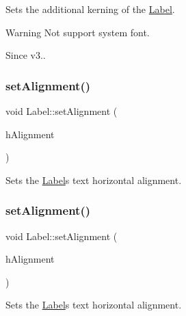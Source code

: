 Sets the additional kerning of the \hyperlink{classLabel}{Label}.

\begin{DoxyWarning}{Warning}
Not support system font. 
\end{DoxyWarning}
\begin{DoxySince}{Since}
v3.. 
\end{DoxySince}
\mbox{\label{classLabel_a2dd709f7a812d19d666b3b063534d34b}} 
\subsubsection{\texorpdfstring{set\+Alignment()}{setAlignment()}\hspace{0.1cm}{\footnotesize\ttfamily [1/4]}}
{\footnotesize\ttfamily void Label\+::set\+Alignment (\begin{DoxyParamCaption}\item[{Text\+H\+Alignment}]{h\+Alignment }\end{DoxyParamCaption})\hspace{0.3cm}{\ttfamily [inline]}}

Sets the \hyperlink{classLabel}{Label}\textquotesingle{}s text horizontal alignment. \mbox{\label{classLabel_a2dd709f7a812d19d666b3b063534d34b}} 
\subsubsection{\texorpdfstring{set\+Alignment()}{setAlignment()}\hspace{0.1cm}{\footnotesize\ttfamily [2/4]}}
{\footnotesize\ttfamily void Label\+::set\+Alignment (\begin{DoxyParamCaption}\item[{Text\+H\+Alignment}]{h\+Alignment }\end{DoxyParamCaption})\hspace{0.3cm}{\ttfamily [inline]}}

Sets the \hyperlink{classLabel}{Label}\textquotesingle{}s text horizontal alignment. \mbox{\label{classLabel_a3fb693a7db81e6b313a2c9c871f8cf63}} 
